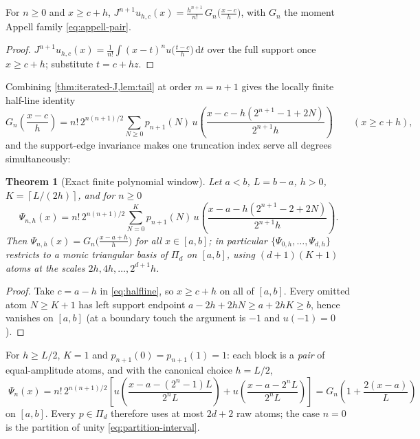 \documentclass[11pt,oneside]{article}
\numberwithin{equation}{section}
\newtheorem{theorem}{Theorem}[section]
\theoremstyle{definition}
\theoremstyle{remark}
\newcommand{\dd}{\,\mathrm d}
\newcommand{\ceil}[1]{\left\lceil #1\right\rceil}
\newcommand{\PiD}{\Pi_d}
\begin{document}
\begin{lemma}
\label{lem:tail}
For $n\ge0$ and $x\ge c+h$,
$J^{n+1}u_{h,c}(x)=\frac{h^{n+1}}{n!}\,
G_n\!\bigl(\frac{x-c}{h}\bigr)$, with $G_n$ the moment Appell family
\eqref{eq:appell-pair}.
\end{lemma}

\begin{proof}
$J^{n+1}u_{h,c}(x)=\frac1{n!}\int(x-t)^{n}u\bigl(\tfrac{t-c}h\bigr)
\dd t$ over the full support once $x\ge c+h$; substitute $t=c+hz$.
\end{proof}

Combining \cref{thm:iterated-J,lem:tail} at order $m=n+1$ gives the
locally finite half-line identity
\begin{equation}
 G_n\!\left(\frac{x-c}{h}\right)
 =n!\,2^{n(n+1)/2}\sum_{N\ge0}p_{n+1}(N)\,
 u\!\left(\frac{x-c-h(2^{n+1}-1+2N)}{2^{n+1}h}\right)
 \qquad(x\ge c+h),
 \label{eq:halfline}
\end{equation}
and the support-edge invariance makes one truncation index serve all
degrees simultaneously:

\begin{theorem}[Exact finite polynomial window]
\label{thm:finite-window}
Let $a<b$, $L=b-a$, $h>0$, $K=\ceil{L/(2h)}$, and for $n\ge0$
\begin{equation}
 \boxed{\;
 \Psi_{n,h}(x)
 =n!\,2^{n(n+1)/2}
 \sum_{N=0}^{K}p_{n+1}(N)\,
 u\!\left(\frac{x-a-h(2^{n+1}-2+2N)}{2^{n+1}h}\right).
 \;}
 \label{eq:Psi-def}
\end{equation}
Then $\Psi_{n,h}(x)=G_n\bigl(\tfrac{x-a+h}h\bigr)$ for all
$x\in[a,b]$; in particular
$\{\Psi_{0,h},\dots,\Psi_{d,h}\}$ restricts to a monic triangular
basis of $\PiD$ on $[a,b]$, using $(d+1)(K+1)$ atoms at the scales
$2h,4h,\dots,2^{d+1}h$.
\end{theorem}

\begin{proof}
Take $c=a-h$ in \eqref{eq:halfline}, so $x\ge c+h$ on all of
$[a,b]$.  Every omitted atom $N\ge K+1$ has left support endpoint
$a-2h+2hN\ge a+2hK\ge b$, hence vanishes on $[a,b]$ (at a boundary
touch the argument is $-1$ and $u(-1)=0$).
\end{proof}

\begin{corollary}
\label{cor:two-atom}
For $h\ge L/2$, $K=1$ and $p_{n+1}(0)=p_{n+1}(1)=1$: each block is a
\emph{pair} of equal-amplitude atoms, and with the canonical choice
$h=L/2$,
\begin{equation}
 \boxed{\;
 \Psi_n(x)
 =n!\,2^{n(n+1)/2}\left[
 u\!\left(\frac{x-a-(2^{n}-1)L}{2^{n}L}\right)
 +u\!\left(\frac{x-a-2^{n}L}{2^{n}L}\right)
 \right]
 =G_n\!\left(1+\frac{2(x-a)}{L}\right)
 \;}
 \label{eq:canonical-Psi}
\end{equation}
on $[a,b]$.  Every $p\in\PiD$ therefore uses at most $2d+2$ raw
atoms; the case $n=0$ is the partition of unity
\eqref{eq:partition-interval}.
\end{corollary}
\end{document}
